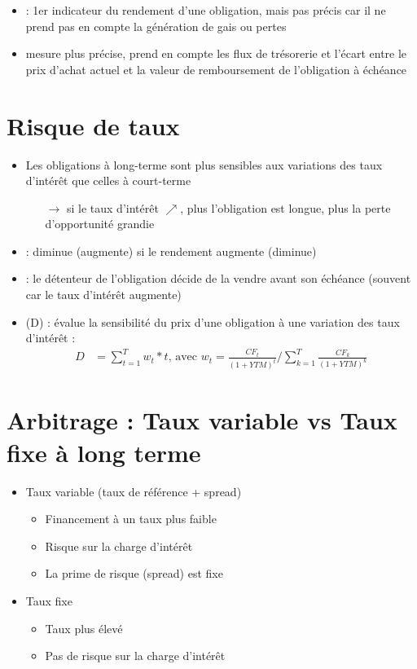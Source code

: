 \begin{itemize}
    \item {} : 1er indicateur du rendement d'une obligation, mais pas précis car il ne prend pas en compte la génération de gais ou pertes
    \item {} mesure plus précise, prend en compte les flux de trésorerie et l'écart entre le prix d'achat actuel et la valeur de remboursement de l'obligation à échéance
\end{itemize}

\section{Risque de taux}

\begin{itemize}
    \item Les obligations à long-terme sont plus sensibles aux variations des taux d'intérêt que celles à court-terme
    \begin{itemize}
        \item[$\rightarrow$] si le taux d'intérêt $\nearrow$, plus l'obligation est longue, plus la perte d'opportunité grandie
    \end{itemize}
    \item {} : diminue (augmente) si le rendement augmente (diminue)
    \item {} : le détenteur de l'obligation décide de la vendre avant son échéance (souvent car le taux d'intérêt augmente)
    \item {} (D) : évalue la sensibilité du prix d'une obligation à une variation des taux d'intérêt :
    \begin{align*}
        D &= \sum_{t=1}^T w_t * t \text{, avec } w_t = \frac{CF_t}{(1+YTM)^t} / \sum_{k=1}^T \frac{CF_k}{(1 + YTM)^k}
    \end{align*}
\end{itemize}

\section{Arbitrage : Taux variable vs Taux fixe à long terme}

\begin{itemize}
    \item Taux variable (taux de référence + spread)
    \begin{itemize}
        \item Financement à un taux plus faible
        \item Risque sur la charge d'intérêt
        \item La prime de risque (spread) est fixe
    \end{itemize}
    \item Taux fixe
    \begin{itemize}
        \item Taux plus élevé
        \item Pas de risque sur la charge d'intérêt
    \end{itemize}
\end{itemize}


